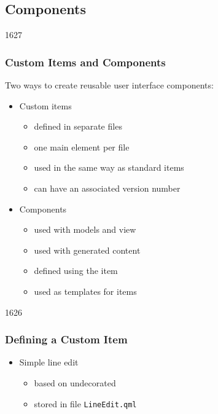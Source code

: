 %
%
%
%

\subsection{Components}

\begin{slide}{1627}
\frametitle{Custom Items and Components}

Two ways to create reusable user interface components:

\begin{itemize}
\item Custom items
  \begin{itemize}
  \item defined in separate files
  \item one main element per file
  \item used in the same way as standard items
  \item can have an associated version number
  \end{itemize}
\item Components
  \begin{itemize}
  \item used with models and view
  \item used with generated content
  \item defined using the  item
  \item used as templates for items
  \end{itemize}
\end{itemize}

\end{slide}


\begin{slide}{1626}
\frametitle{Defining a Custom Item}


\begin{itemize}
\item Simple line edit
  \begin{itemize}
  \item based on undecorated 
  \item stored in file \texttt{LineEdit.qml}
  \end{itemize}
\end{itemize}


\end{slide}

